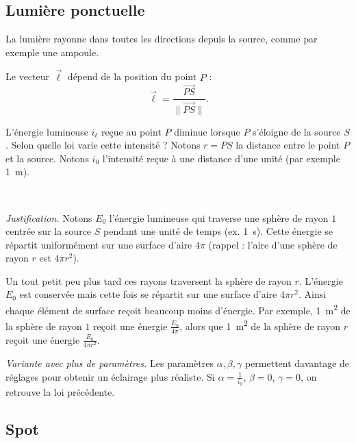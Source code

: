 \documentclass[11pt,class=report,crop=false]{standalone}
\begin{document}
\subsection{Lumière ponctuelle}

La lumière \og{}rayonne\fg{} dans toutes les directions depuis la source, comme par exemple une ampoule.



Le vecteur $\vec\ell$ dépend de la position du point $P$ :
$$\vec \ell = \frac{\overrightarrow{PS}}{\|\overrightarrow{PS}\|}.$$

L'énergie lumineuse $i_\ell$ reçue au point $P$ diminue lorsque $P$ s'éloigne de la source $S$. Selon quelle loi varie cette intensité ?
Notons $r = PS$ la distance entre le point $P$ et la source. Notons $i_0$ l'intensité reçue à une distance d'une unité (par exemple \SI{1}{\meter}).
\begin{proposition}
~
\end{proposition}

\emph{Justification.} Notons $E_0$ l'énergie lumineuse qui traverse une sphère de rayon $1$ centrée sur la source $S$ pendant une unité de temps (ex. \SI{1}{\second}). Cette énergie se répartit uniformément sur une surface d'aire $4\pi$ (rappel : l'aire d'une sphère de rayon $r$ est $4\pi r^2$). 



Un tout petit peu plus tard ces rayons traversent la sphère de rayon $r$. L'énergie $E_0$ est conservée mais cette fois se répartit sur une surface d'aire $4\pi r^2$. Ainsi chaque élément de surface reçoit beaucoup moins d'énergie.
Par exemple, \SI{1}{\meter^2} de la sphère de rayon $1$ reçoit une énergie $\frac{E_0}{4\pi}$, alors que \SI{1}{\meter^2} de la sphère de rayon $r$  reçoit une énergie $\frac{E_0}{4\pi r^2}$.

\bigskip

\emph{Variante avec plus de paramètres.} 
Les paramètres $\alpha,\beta,\gamma$ permettent davantage de réglages pour obtenir un éclairage plus réaliste. Si $\alpha = \frac{1}{i_0}$, $\beta=0$, $\gamma=0$, on retrouve la loi précédente.

\subsection{Spot}
\end{document}
